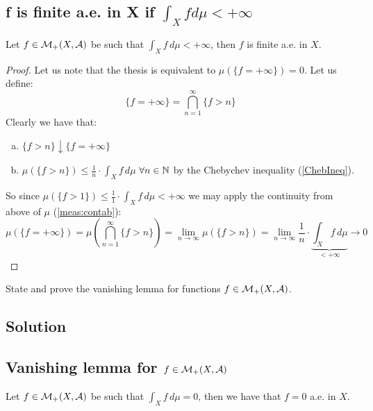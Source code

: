 \subsection{f is finite a.e. in X if \texorpdfstring{$\int_X f d\mu < +\infty$}{ its integral is finite}} \label{intfin:ffin}
Let $f \in \mathcal{M}_+(X, \mathcal{A})$ be such that $\int_X f \, d\mu < +\infty$, then $f$ is finite a.e. in $X$.

\begin{proof}
    Let us note that the thesis is equivalent to $\mu(\{ f = +\infty\}) = 0$. Let us define:
    \[
        \{ f = + \infty \} = \bigcap_{n=1}^\infty \{ f > n \}    
    \]
    Clearly we have that:
    \begin{enumerate}[a)]
        \item $\{ f > n\} \downarrow \{ f = +\infty \}$
        \item $\mu (\{ f > n \}) \leq \frac{1}{n}\cdot \int_X f\, d\mu$ $\forall n\in\mathbb{N}$ by the Chebychev inequality (\ref{ChebIneq}).
    \end{enumerate}
    So since $\mu(\{f > 1\}) \leq \frac{1}{1}\cdot \int_X f \, d\mu < +\infty$ we may apply the continuity from above of $\mu$ (\ref{meas:contab}):
    \[
        \mu (\{ f= +\infty \}) = \mu \left( \bigcap_{n=1}^\infty \{f>n\} \right) = \lim_{n\to\infty} \mu(\{f>n\}) = \lim_{n\to\infty} \frac{1}{n}\cdot \underbrace{\int_X f \, d\mu}_{<+\infty} \longrightarrow 0  
    \]
\end{proof}


\question

State and prove the vanishing lemma for functions $f \in \mathcal{M}_+(X, \mathcal{A})$.

\subsection*{Solution}

\subsection{Vanishing lemma for \texorpdfstring{$f \in \mathcal{M}_+(X, \mathcal{A})$}{nonnegative measurable functions}} \label{VanLem}

Let $f \in \mathcal{M}_+(X, \mathcal{A})$ be such that $\int_X f \, d\mu = 0 $, then we have that $f=0$ a.e. in $X$.

